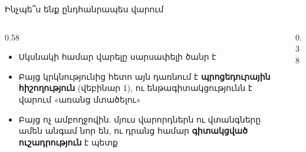 \begin{frame}{Ինչպե՞ս ենք ընդհանրապես վարում}
  \begin{columns}[c]
    \begin{column}{0.58\textwidth}
      \begin{itemize}
        \item Սկսնակի համար վարելը սարսափելի ծանր է
        \item<2-> Բայց կրկնությունից հետո այն դառնում է \textbf{պրոցեդուրային հիշողություն} (վեբինար 1), ու ենթագիտակցությունն է վարում «առանց մտածելու»
        \item<3-> Բայց ոչ ամբողջովին. մյուս վարորդներն ու վտանգները ամեն անգամ նոր են, ու դրանց համար \textbf{գիտակցված ուշադրություն} է պետք
      \end{itemize}
    \end{column}
    \begin{column}{0.38\textwidth}
      \centering
      \par\medskip
    \end{column}
  \end{columns}
\end{frame}

